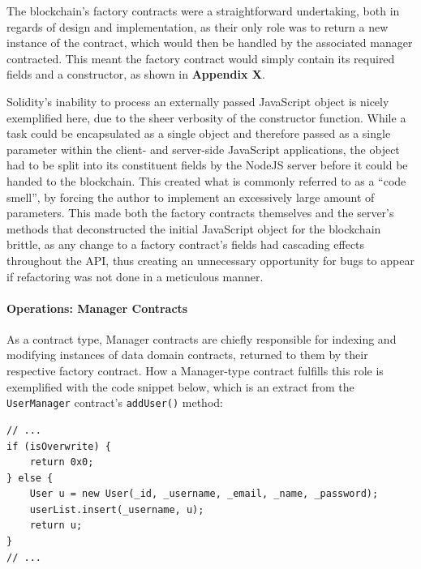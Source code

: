 \documentclass[12pt]{report}
\let\oldparagraph\paragraph
\renewcommand{\paragraph}[1]{\oldparagraph{#1}\mbox{}}
\begin{document}
The blockchain's factory contracts were a straightforward undertaking,
both in regards of design and implementation, as their only role was to
return a new instance of the contract, which would then be handled by
the associated manager contracted. This meant the factory contract would
simply contain its required fields and a constructor, as shown in
\textbf{Appendix X}.

Solidity's inability to process an externally passed JavaScript object
is nicely exemplified here, due to the sheer verbosity of the
constructor function. While a task could be encapsulated as a single
object and therefore passed as a single parameter within the client- and
server-side JavaScript applications, the object had to be split into its
constituent fields by the NodeJS server before it could be handed to the
blockchain. This created what is commonly referred to as a ``code
smell''\cite{tufano2015codesmell}, by forcing the author to
implement an excessively large amount of parameters. This made both the
factory contracts themselves and the server's methods that deconstructed
the initial JavaScript object for the blockchain brittle, as any change
to a factory contract's fields had cascading effects throughout the API,
thus creating an unnecessary opportunity for bugs to appear if
refactoring was not done in a meticulous manner.

\paragraph{Operations: Manager
Contracts}\label{operations-manager-contracts}

As a contract type, Manager contracts are chiefly responsible for
indexing and modifying instances of data domain contracts, returned to
them by their respective factory contract. How a Manager-type contract
fulfills this role is exemplified with the code snippet below, which is
an extract from the \texttt{UserManager} contract's \texttt{addUser()}
method:

\begin{verbatim}
// ...
if (isOverwrite) {
    return 0x0;
} else {
    User u = new User(_id, _username, _email, _name, _password);
    userList.insert(_username, u);
    return u;
}
// ...
\end{verbatim}
\end{document}

